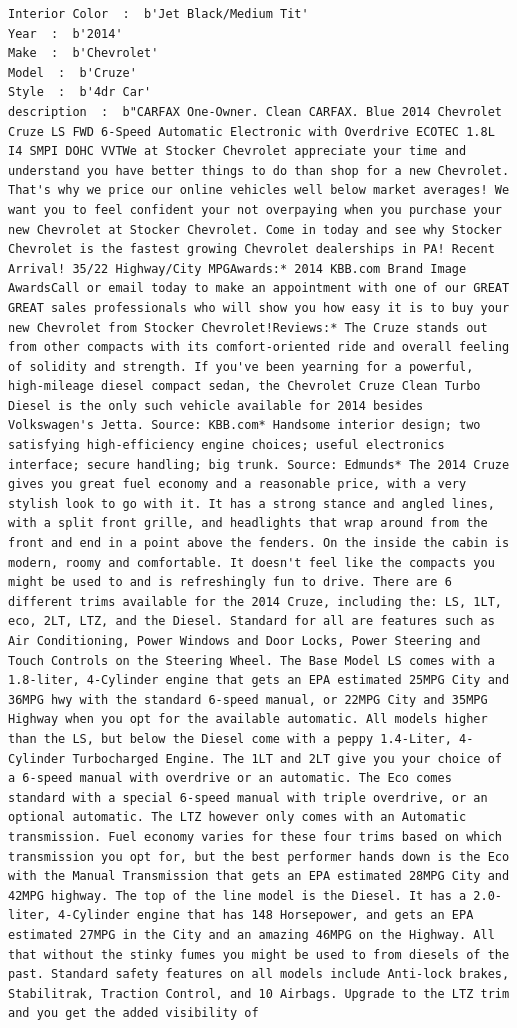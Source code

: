 \documentclass[11pt]{article}
\begin{document}
\begin{Verbatim}[commandchars=\\\{\}]
Interior Color  :  b'Jet Black/Medium Tit'
Year  :  b'2014'
Make  :  b'Chevrolet'
Model  :  b'Cruze'
Style  :  b'4dr Car'
description  :  b"CARFAX One-Owner. Clean CARFAX. Blue 2014 Chevrolet Cruze LS FWD 6-Speed Automatic Electronic with Overdrive ECOTEC 1.8L I4 SMPI DOHC VVTWe at Stocker Chevrolet appreciate your time and understand you have better things to do than shop for a new Chevrolet. That's why we price our online vehicles well below market averages! We want you to feel confident your not overpaying when you purchase your new Chevrolet at Stocker Chevrolet. Come in today and see why Stocker Chevrolet is the fastest growing Chevrolet dealerships in PA! Recent Arrival! 35/22 Highway/City MPGAwards:* 2014 KBB.com Brand Image AwardsCall or email today to make an appointment with one of our GREAT GREAT sales professionals who will show you how easy it is to buy your new Chevrolet from Stocker Chevrolet!Reviews:* The Cruze stands out from other compacts with its comfort-oriented ride and overall feeling of solidity and strength. If you've been yearning for a powerful, high-mileage diesel compact sedan, the Chevrolet Cruze Clean Turbo Diesel is the only such vehicle available for 2014 besides Volkswagen's Jetta. Source: KBB.com* Handsome interior design; two satisfying high-efficiency engine choices; useful electronics interface; secure handling; big trunk. Source: Edmunds* The 2014 Cruze gives you great fuel economy and a reasonable price, with a very stylish look to go with it. It has a strong stance and angled lines, with a split front grille, and headlights that wrap around from the front and end in a point above the fenders. On the inside the cabin is modern, roomy and comfortable. It doesn't feel like the compacts you might be used to and is refreshingly fun to drive. There are 6 different trims available for the 2014 Cruze, including the: LS, 1LT, eco, 2LT, LTZ, and the Diesel. Standard for all are features such as Air Conditioning, Power Windows and Door Locks, Power Steering and Touch Controls on the Steering Wheel. The Base Model LS comes with a 1.8-liter, 4-Cylinder engine that gets an EPA estimated 25MPG City and 36MPG hwy with the standard 6-speed manual, or 22MPG City and 35MPG Highway when you opt for the available automatic. All models higher than the LS, but below the Diesel come with a peppy 1.4-Liter, 4-Cylinder Turbocharged Engine. The 1LT and 2LT give you your choice of a 6-speed manual with overdrive or an automatic. The Eco comes standard with a special 6-speed manual with triple overdrive, or an optional automatic. The LTZ however only comes with an Automatic transmission. Fuel economy varies for these four trims based on which transmission you opt for, but the best performer hands down is the Eco with the Manual Transmission that gets an EPA estimated 28MPG City and 42MPG highway. The top of the line model is the Diesel. It has a 2.0-liter, 4-Cylinder engine that has 148 Horsepower, and gets an EPA estimated 27MPG in the City and an amazing 46MPG on the Highway. All that without the stinky fumes you might be used to from diesels of the past. Standard safety features on all models include Anti-lock brakes, Stabilitrak, Traction Control, and 10 Airbags. Upgrade to the LTZ trim and you get the added visibility of 
\end{Verbatim}
\end{document}
